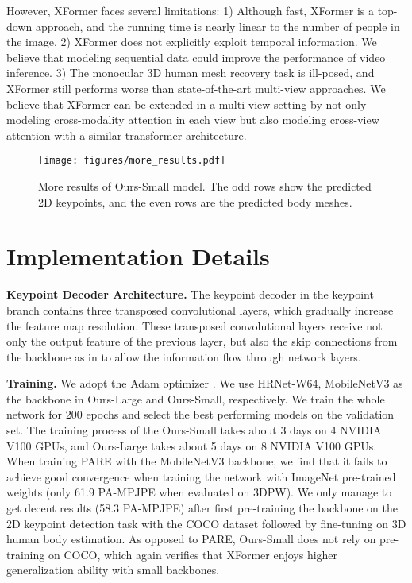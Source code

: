 \documentclass{article}
\newcommand\mypara[1]{\noindent\textbf{#1}}
\begin{document}
However, XFormer faces several limitations: 1) Although fast, XFormer is a top-down approach, and the running time is nearly linear to the number of people in the image. 
2) XFormer does not explicitly exploit temporal information. We believe that modeling sequential data could improve the performance of video inference. 3) The monocular 3D human mesh recovery task is ill-posed, and XFormer still performs worse than state-of-the-art multi-view approaches. We believe that XFormer can be extended in a multi-view setting by not only modeling cross-modality attention in each view but also modeling cross-view attention with a similar transformer architecture.





\appendix


\begin{figure*}[]
  \centering
  \texttt{[image: figures/more\_results.pdf]}
  \caption{More results of Ours-Small model. The odd rows show the predicted 2D keypoints, and the even rows are the predicted body meshes.} 
  \label{fig:results}
\end{figure*}

\section{Implementation Details}

\mypara{Keypoint Decoder Architecture.} 
The keypoint decoder in the keypoint branch contains three transposed convolutional layers, which gradually increase the feature map resolution. These transposed convolutional layers receive not only the output feature of the previous layer, but also the skip connections from the backbone as in \cite{ronneberger2015u} to allow the information flow through network layers.

\mypara{Training.}
We adopt the Adam optimizer \cite{kingma2014adam}.
We use HRNet-W64, MobileNetV3 as the backbone in Ours-Large and Ours-Small, respectively.
We train the whole network for 200 epochs and select the best performing models on the validation set. The training process of the Ours-Small takes about 3 days on 4 NVIDIA V100 GPUs, and Ours-Large takes about 5 days on 8 NVIDIA V100 GPUs. When training PARE \cite{kocabas2021pare}  with the MobileNetV3 backbone, we find that it fails to achieve good convergence when training the network with ImageNet pre-trained weights (only 61.9 PA-MPJPE when evaluated on 3DPW). We only manage to get decent results (58.3 PA-MPJPE) after first pre-training the backbone on the 2D keypoint detection task with the COCO dataset followed by fine-tuning on 3D human body estimation. As opposed to PARE, Ours-Small does not rely on pre-training on COCO, which again verifies that XFormer enjoys higher generalization ability with small backbones.
\end{document}
